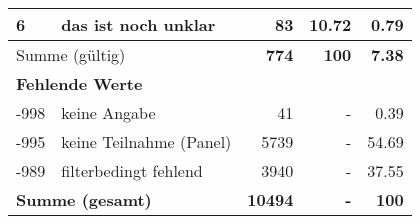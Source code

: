 \begin{longtable}{lXrrr}
     6 &
     \multicolumn{1}{X}{ das ist noch unklar   } &


       \num{83} &
       \num[round-mode=places,round-precision=2]{10.72} &
         \num[round-mode=places,round-precision=2]{0.79} \\
     \midrule
     \multicolumn{2}{l}{Summe (gültig)} &
       \textbf{\num{774}} &
     \textbf{\num{100}} &
       \textbf{\num[round-mode=places,round-precision=2]{7.38}} \\
     \multicolumn{5}{l}{\textbf{Fehlende Werte}}\\
       -998 &
       keine Angabe &
         \num{41} &
        - &
         \num[round-mode=places,round-precision=2]{0.39} \\
       -995 &
       keine Teilnahme (Panel) &
         \num{5739} &
        - &
         \num[round-mode=places,round-precision=2]{54.69} \\
       -989 &
       filterbedingt fehlend &
         \num{3940} &
        - &
         \num[round-mode=places,round-precision=2]{37.55} \\
     \midrule
     \multicolumn{2}{l}{\textbf{Summe (gesamt)}} &
          \textbf{\num{10494}} &
        \textbf{-} &
        \textbf{\num{100}} \\
     \bottomrule
     \end{longtable}
     
